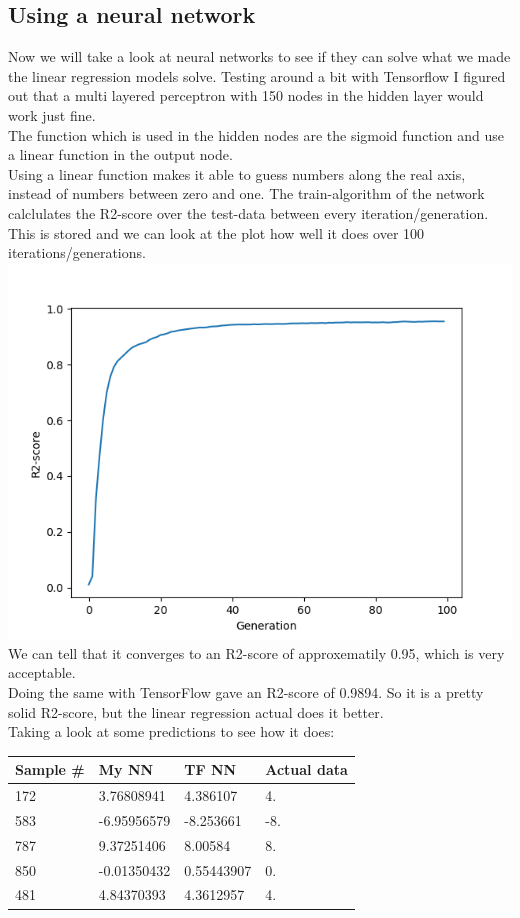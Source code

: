 \documentclass[a4paper,norsk]{article}
\begin{document}
\subsection{Using a neural network}
Now we will take a look at neural networks to see if they can solve what we made the linear regression models solve. Testing around a bit with Tensorflow I figured out that a multi layered perceptron with 150 nodes in the hidden layer would work just fine.\\
The function which is used in the hidden nodes are the sigmoid function and use a linear function in the output node.\\
Using a linear function makes it able to guess numbers along the real axis, instead of numbers between zero and one.
The train-algorithm of the network calclulates the R2-score over the test-data between every iteration/generation. This is stored and we can look at the plot how well it does over 100 iterations/generations.\\
\includegraphics[scale=.7]{images/linearNN}\\
We can tell that it converges to an R2-score of approxematily 0.95, which is very acceptable.\\
Doing the same with TensorFlow gave an R2-score of 0.9894. So it is a pretty solid R2-score, but the linear regression actual does it better.\\
Taking a look at some predictions to see how it does:\\
\begin{center}
    \begin{tabular}{| l | l | l | l |}
    \hline
    Sample \# & My NN & TF NN & Actual data \\ \hline
    172 & 3.76808941 & 4.386107 & 4. \\ \hline
    583 & -6.95956579 & -8.253661 &-8. \\ \hline
    787 & 9.37251406 & 8.00584 &8. \\ \hline
    850 & -0.01350432 & 0.55443907 &0. \\ \hline
    481 & 4.84370393 & 4.3612957 &4. \\
    \hline
    \end{tabular}
\end{center}
\end{document}
